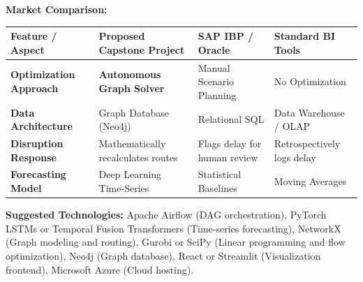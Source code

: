 \documentclass[11pt, a4paper]{article}
\begin{document}
\vspace{0.4cm}
\noindent\textbf{Market Comparison:}

\vspace{0.2cm}
\noindent\renewcommand{\arraystretch}{1.5}
\begin{tabular}{|p{3.5cm}|p{4.5cm}|p{3.8cm}|p{3.8cm}|}
\hline
\textbf{Feature / Aspect} & \textbf{Proposed Capstone Project} & \textbf{SAP IBP / Oracle} & \textbf{Standard BI Tools} \\
\hline
\textbf{Optimization Approach}& \textbf{Autonomous Graph Solver} & Manual Scenario Planning & No Optimization \\
\hline
\textbf{Data Architecture} & Graph Database (Neo4j) & Relational SQL & Data Warehouse / OLAP \\
\hline
\textbf{Disruption Response} & Mathematically recalculates routes & Flags delay for human review & Retrospectively logs delay \\
\hline
\textbf{Forecasting Model} & Deep Learning Time-Series & Statistical Baselines & Moving Averages \\
\hline
\end{tabular}

\vspace{0.4cm}
\noindent\textbf{Suggested Technologies:} Apache Airflow (DAG orchestration), PyTorch LSTMs or Temporal Fusion Transformers (Time-series forecasting), NetworkX (Graph modeling and routing), Gurobi or SciPy (Linear programming and flow optimization), Neo4j (Graph database), React or Streamlit (Visualization frontend), Microsoft Azure (Cloud hosting).
\end{document}
